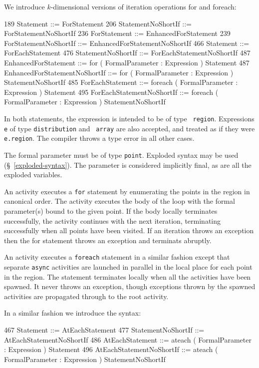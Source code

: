 We introduce  $k$-dimensional versions of iteration operations {\cf for} and 
{\cf foreach}:

\begin{x10}
189 Statement ::= ForStatement
206 StatementNoShortIf ::= 
      ForStatementNoShortIf
236 ForStatement ::= EnhancedForStatement
239 ForStatementNoShortIf ::= 
      EnhancedForStatementNoShortIf
466 Statement ::= ForEachStatement
476 StatementNoShortIf ::= 
      ForEachStatementNoShortIf
487 EnhancedForStatement ::= 
       for ( FormalParameter : Expression ) 
         Statement
487 EnhancedForStatementNoShortIf ::= 
       for ( FormalParameter : Expression ) 
           StatementNoShortIf
485  ForEachStatement ::= 
       foreach ( FormalParameter : Expression ) 
           Statement
495  ForEachStatementNoShortIf ::= 
        foreach ( FormalParameter : Expression ) 
          StatementNoShortIf
\end{x10}

In both statements, the expression is intended to be of type {\tt
region}.  Expressions {\tt e} of type {\tt distribution} and {\tt
array} are also accepted, and treated as if they were {\tt
e.region}. The compiler throws a type error in all other cases.

The formal parameter must be of type {\tt point}. Exploded syntax may
be used (\S~\ref{exploded-syntax}). The parameter is considered
implicitly final, as are all the exploded variables. 

An activity executes a {\tt for} statement by enumerating the points
in the region in canonical order. The activity executes the body of
the loop with the formal parameter(s) bound to the given point. If the
body locally terminates successfully, the activity continues with the
next iteration, terminating successfully when all points have been
visited. If an iteration throws an exception then the for statement
throws an exception and terminats abruptly.

An activity executes a {\tt foreach} statement in a similar fashion
except that separate {\tt async} activities are launched in parallel
in the local place for each point in the region. The statement
terminates locally when all the activities have been spawned. It never
throws an exception, though exceptions thrown by the spawned
activities are propagated through to the root activity.

In a similar fashion we introduce the syntax:
\begin{x10}
467 Statement ::= AtEachStatement
477 StatementNoShortIf ::= 
      AtEachStatementNoShortIf
486 AtEachStatement ::= 
      ateach ( FormalParameter : Expression ) 
         Statement
496 AtEachStatementNoShortIf ::= 
      ateach ( FormalParameter : Expression ) 
          StatementNoShortIf
\end{x10}

